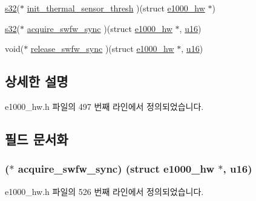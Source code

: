 \begin{DoxyCompactItemize}
\item 
\hyperlink{lib_2igb_2e1000__osdep_8h_ae9b1af5c037e57a98884758875d3a7c4}{s32}($\ast$ \hyperlink{structe1000__mac__operations_aa5b6c364175ebc48c0891fd5ae929acd}{init\+\_\+thermal\+\_\+sensor\+\_\+thresh} )(struct \hyperlink{structe1000__hw}{e1000\+\_\+hw} $\ast$)
\item 
\hyperlink{lib_2igb_2e1000__osdep_8h_ae9b1af5c037e57a98884758875d3a7c4}{s32}($\ast$ \hyperlink{structe1000__mac__operations_aa301c95c2881707d1835167cc2bc2019}{acquire\+\_\+swfw\+\_\+sync} )(struct \hyperlink{structe1000__hw}{e1000\+\_\+hw} $\ast$, \hyperlink{lib_2igb_2e1000__osdep_8h_acdc9cf0314be0ae5a01d6d4379a95edd}{u16})
\item 
void($\ast$ \hyperlink{structe1000__mac__operations_a0aa9b26ec01a96e7f41f49e00f527ae3}{release\+\_\+swfw\+\_\+sync} )(struct \hyperlink{structe1000__hw}{e1000\+\_\+hw} $\ast$, \hyperlink{lib_2igb_2e1000__osdep_8h_acdc9cf0314be0ae5a01d6d4379a95edd}{u16})
\end{DoxyCompactItemize}


\subsection{상세한 설명}


e1000\+\_\+hw.\+h 파일의 497 번째 라인에서 정의되었습니다.



\subsection{필드 문서화}
\subsubsection[{\texorpdfstring{acquire\+\_\+swfw\+\_\+sync}{acquire_swfw_sync}}]{($\ast$ acquire\+\_\+swfw\+\_\+sync) (struct {\bf e1000\+\_\+hw} $\ast$, {\bf u16})}\hypertarget{structe1000__mac__operations_aa301c95c2881707d1835167cc2bc2019}{}\label{structe1000__mac__operations_aa301c95c2881707d1835167cc2bc2019}


e1000\+\_\+hw.\+h 파일의 526 번째 라인에서 정의되었습니다.

